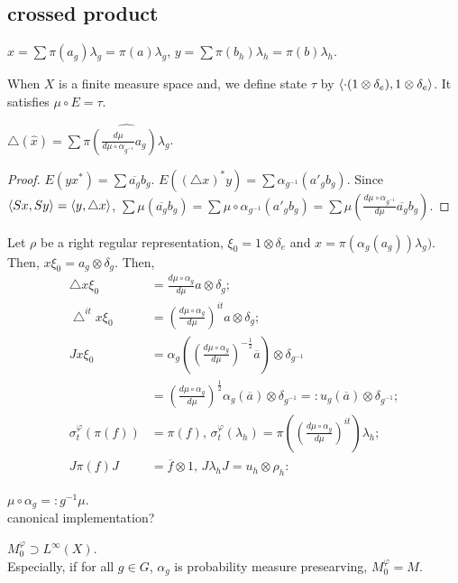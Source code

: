 \subsection{crossed product}

 $x = \sum \pi(a_g)\lambda_g = \pi(a) \lambda_g$, $y = \sum \pi(b_h)\lambda_h = \pi(b)\lambda_h$.

When $X$ is a finite measure space and, we define state $\tau$ by $\langle\cdot(1\otimes\delta_e),1 \otimes \delta_e\rangle$.
It satisfies $\mu \circ E = \tau$.

\begin{theorem}
  $\bigtriangleup (\hat{x}) = \sum \widehat{\pi(\frac{d\mu}{d\mu\circ\alpha_{g^{-1}}}a_g)\lambda_g}$.
\end{theorem}

\begin{proof}
  $E(yx^*)= \sum \overline{a_g}b_g$.
  $E((\bigtriangleup x)^*y) = \sum \alpha_{g^{-1}} (a'_gb_g)$.
  Since $\langle Sx,Sy\rangle = \langle y,\bigtriangleup x \rangle$, $\sum \mu(\overline{a_g}b_g) = \sum \mu \circ \alpha_{g^{-1}}(a'_gb_g) = \sum \mu (\frac{d\mu\circ\alpha_{g^{-1}}}{d\mu}\overline{a_g}b_g)$.
\end{proof}

Let $\rho$ be a right regular representation, $\xi_0 = 1 \otimes \delta_e$ and $x = \pi(\alpha_g(a_g))\lambda_g)$.
Then, $x\xi_0 = a_g \otimes \delta_g$. Then,
\begin{align*}
  \bigtriangleup x \xi_0 &=\frac{d{\mu \circ \alpha_g}}{d\mu}a \otimes \delta_g;\\
  \bigtriangleup^{it} x \xi_0 &=\left(\frac{d{\mu \circ \alpha_g}}{d\mu}\right)^{it}a \otimes \delta_g;\\
  Jx\xi_0 &=\alpha_g\left(\left(\frac{d{\mu \circ \alpha_g}}{d\mu}\right)^{-\frac{1}{2}}\overline{a}\right) \otimes \delta_{g^{-1}}\\
  &= \left(\frac{d{\mu \circ \alpha_g}}{d\mu}\right)^{\frac{1}{2}}\alpha_g(\overline{a}) \otimes \delta_{g^{-1}}
  =:  u_g(\overline{a}) \otimes \delta_{g^{-1}};\\
  \sigma_t^{\varphi}(\pi(f)) &= \pi (f), \, 
  \sigma_t^{\varphi}(\lambda_h) = \pi\left( \left(\frac{d{\mu \circ \alpha_g}}{d\mu}\right)^{it}\right) \lambda_h;\\
  J\pi(f)J &= \overline{f} \otimes 1, \, 
  J\lambda_hJ=u_h \otimes \rho_h:
\end{align*}

$\mu \circ \alpha_g =: g^{-1}\mu$.\\
canonical implementation?

\begin{theorem}
  $M_0^\varphi \supset L^\infty(X)$. \\
  Especially, if for all $g \in G$, $\alpha_g$ is probability measure presearving, $M_0^\varphi = M$.
\end{theorem}
